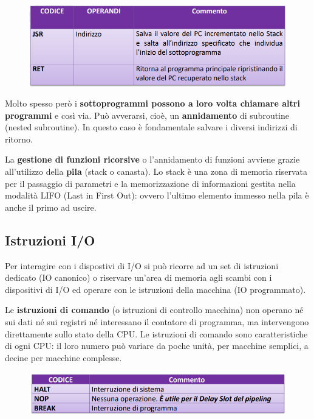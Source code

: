 \documentclass[12pt]{article} %
\begin{document}
\begin{figure}[h]
    \centering
    \includegraphics[width=1\linewidth]{subroutine.png}
\end{figure}
\par\maketitle\noindent
Molto spesso però i \textbf{sottoprogrammi possono a loro volta chiamare altri programmi} e così via. Può avverarsi, cioè, un \textbf{annidamento} di subroutine (nested subroutine). In questo caso è fondamentale salvare i diversi indirizzi di ritorno.\par\medskip\noindent
La \textbf{gestione di funzioni ricorsive} o l’annidamento di funzioni avviene grazie all’utilizzo della \textbf{pila} (stack o canasta). Lo stack è una zona di memoria riservata per il passaggio di parametri e la memorizzazione di informazioni gestita nella modalità LIFO (Last in First Out): ovvero l’ultimo elemento immesso nella pila è anche il primo ad uscire.\\
\subsection{Istruzioni I/O}
Per interagire con i dispostivi di I/O si può ricorre ad un set di istruzioni dedicato (IO canonico) o riservare un’area di memoria agli scambi con i dispositivi di I/O ed operare con le istruzioni della macchina (IO programmato).\par\medskip\noindent
Le \textbf{istruzioni di comando} (o istruzioni di controllo macchina) non operano né sui dati né sui registri né interessano il contatore di programma, ma intervengono direttamente sullo stato della CPU. Le istruzioni di comando sono caratteristiche di ogni CPU: il loro numero può variare da poche unità, per macchine semplici, a decine per macchine complesse.
\begin{figure}[h]
    \centering
    \includegraphics[width=1\linewidth]{input o out.png}
\end{figure}
\end{document}
